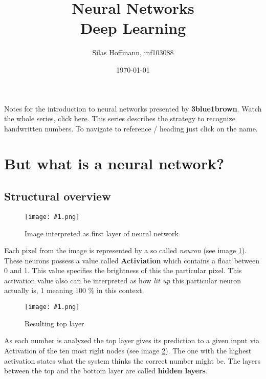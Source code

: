 \documentclass{article}
\title{%
Neural Networks \\
\large Deep Learning}
\author{Silas Hoffmann, inf103088}
\date{\today}
\newcommand{\lbl}[1]{(see image \ref{#1})}
\newcommand{\img}[1]{
	\centering
	\texttt{[image: \#1.png]}
	\label{#1}
}
\begin{document}
\maketitle

\vspace{0.5cm}
\tableofcontents
\vspace{1cm}

Notes for the introduction to neural networks presented by \textbf{3blue1brown}. Watch the whole series, click \href{https://www.youtube.com/watch?v=aircAruvnKk}{\color{blue} {here}}. This series describes the strategy to recognize handwritten numbers. To navigate to reference / heading just click on the name.

\clearpage
\listoffigures
\clearpage

\section{But what is a neural network?}


\subsection{Structural overview}

\FloatBarrier

\begin{figure}[h]
\img{ai_1}
\caption{Image interpreted as first layer of neural network}
\end{figure}

Each pixel from the image is represented by a so called \textit{neuron} \lbl{ai_1}. These neurons possess a value called \textbf{Activiation} which contains a float between 0 and 1. This value specifies the brightness of this the particular pixel. This activation value also can be interpreted as how \textit{lit up} this particular neuron actually is, 1 meaning 100 \% in this context.


\begin{figure}[b!]
\img{ai_2}
\caption{Resulting top layer}
\end{figure}

As each number is analyzed the top layer gives its prediction to a given input via Activation of the ten most right nodes \lbl{ai_2}. The one with the highest activation states what the system thinks the correct number might be. The layers between the top and the bottom layer are called \textbf{hidden layers}. 
\end{document}
